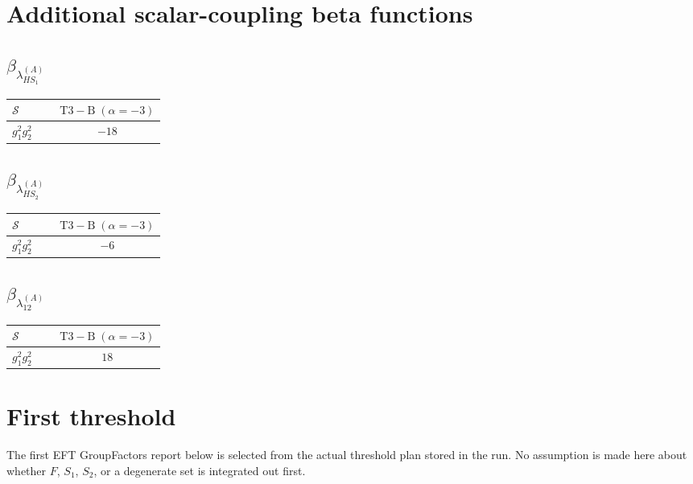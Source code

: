 \documentclass[9pt]{article}
\begin{document}
\section*{Additional scalar-coupling beta functions}
\subsection*{$ \beta_{\lambda_{HS_1}^{(A)}} $}
\begin{longtable}{@{}p{0.31\linewidth}c@{}}
\toprule
$\mathcal{S}$ & $ \mathrm{T3-B}\;(\alpha=-3) $ \\
\midrule
$ g_1^2g_2^2 $ & $ -18 $ \\
\bottomrule
\end{longtable}
\subsection*{$ \beta_{\lambda_{HS_2}^{(A)}} $}
\begin{longtable}{@{}p{0.31\linewidth}c@{}}
\toprule
$\mathcal{S}$ & $ \mathrm{T3-B}\;(\alpha=-3) $ \\
\midrule
$ g_1^2g_2^2 $ & $ -6 $ \\
\bottomrule
\end{longtable}
\subsection*{$ \beta_{\lambda_{12}^{(A)}} $}
\begin{longtable}{@{}p{0.31\linewidth}c@{}}
\toprule
$\mathcal{S}$ & $ \mathrm{T3-B}\;(\alpha=-3) $ \\
\midrule
$ g_1^2g_2^2 $ & $ 18 $ \\
\bottomrule
\end{longtable}
\section*{First threshold}
The first EFT GroupFactors report below is selected from the actual threshold plan stored in the run.  No assumption is made here about whether $F$, $S_1$, $S_2$, or a degenerate set is integrated out first.
\end{document}
